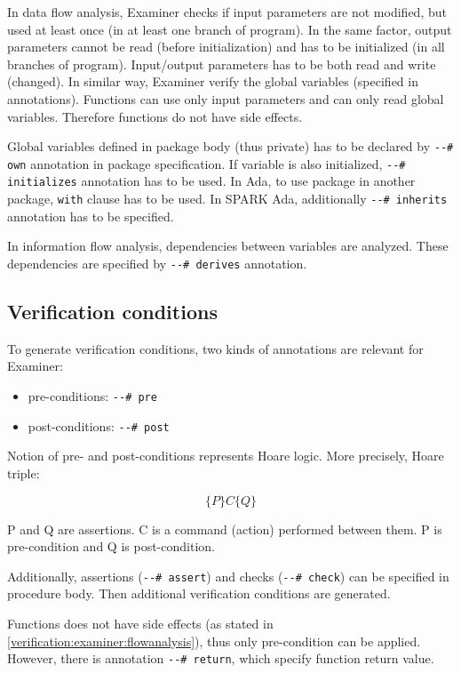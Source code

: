 In data flow analysis, Examiner checks if input parameters are not modified, but used at least once (in at least one branch of program). In the same factor, output parameters cannot be read (before initialization) and has to be initialized (in all branches of program). Input/output parameters has to be both read and write (changed). In similar way, Examiner verify the global variables (specified in annotations). Functions can use only input parameters and can only read global variables. Therefore functions do not have side effects. 

Global variables defined in package body (thus private) has to be declared by \lstinline{--# own} annotation in package specification. If variable is also initialized, \lstinline{--# initializes} annotation has to be used. In Ada, to use package in another package, \lstinline{with} clause has to be used. In SPARK Ada, additionally \lstinline{--# inherits} annotation has to be specified.

In information flow analysis, dependencies between variables are analyzed. These dependencies are specified by \lstinline{--# derives} annotation.


\subsection{Verification conditions}
\label{verification:examiner:vc}

To generate verification conditions, two kinds of annotations are relevant for Examiner:
\begin{itemize}
	\item pre-conditions: \lstinline{--# pre}
	\item post-conditions: \lstinline{--# post}
\end{itemize}

Notion of pre- and post-conditions represents Hoare logic. More precisely, Hoare triple: 

\begin{equation} \label{eq:hoare_triple}
	\{P\} C \{Q\}
\end{equation}

P and Q are assertions. C is a command (action) performed between them. P is pre-condition and Q is post-condition.

Additionally, assertions (\lstinline{--# assert}) and checks (\lstinline{--# check}) can be specified in procedure body. Then additional verification conditions are generated.

Functions does not have side effects (as stated in \ref{verification:examiner:flowanalysis}), thus only pre-condition can be applied. However, there is annotation \lstinline{--# return}, which specify function return value.

